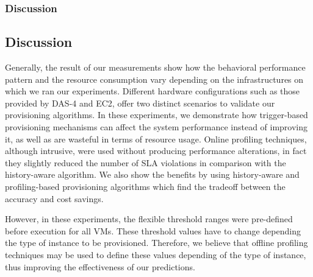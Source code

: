 \subsubsection{Discussion}


\subsection{Discussion}



Generally, the result of our measurements show how the behavioral performance pattern and the resource consumption vary depending on the infrastructures on which we ran our experiments. Different hardware configurations such as those provided by DAS-4 and EC2, offer two distinct scenarios to validate our provisioning algorithms.  In these experiments, we demonstrate how trigger-based provisioning mechanisms can affect the system performance instead of improving it, as well as are wasteful in terms of resource usage. Online profiling techniques, although intrusive, were used without producing performance alterations, in fact they slightly reduced the number of SLA violations in comparison with the history-aware algorithm. We also show the benefits by using history-aware and profiling-based provisioning algorithms which find the tradeoff between the accuracy and cost savings. 

However, in these experiments, the flexible threshold ranges were pre-defined before execution for all VMs. These threshold values have to change depending the type of instance to be provisioned. Therefore, we believe that offline profiling techniques may be used to define these values depending of the type of instance, thus improving the effectiveness of our predictions.




